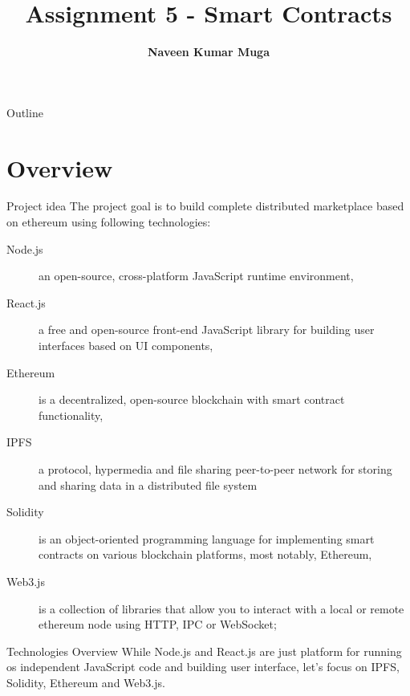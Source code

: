 \documentclass[9pt]{beamer}
\title[Beamer Name]{Assignment 5 - Smart Contracts} %
\author[N. K. Muga]{ \textbf{\Large Naveen Kumar Muga}} %
\institute[UAB]{\large nmuga@uab.edu}
\date{}
\begin{document}
\frame[plain]{\titlepage}


\begin{frame}{Outline}
  \tableofcontents
\end{frame}

\section{Overview}

\begin{frame}{Project idea}
    The project goal is to build complete distributed marketplace based on ethereum using following technologies:
    \begin{description}
        \item[Node.js] an open-source, cross-platform JavaScript runtime environment,
        \item[React.js] a free and open-source front-end JavaScript library for building user interfaces based on UI components,
        \item[Ethereum] is a decentralized, open-source blockchain with smart contract functionality,
        \item[IPFS] a protocol, hypermedia and file sharing peer-to-peer network for storing and sharing data in a distributed file system
        \item[Solidity] is an object-oriented programming language for implementing smart contracts on various blockchain platforms, most notably, Ethereum,
        \item[Web3.js] is a collection of libraries that allow you to interact with a local or remote ethereum node using HTTP, IPC or WebSocket;
    \end{description}
\end{frame}

\begin{frame}{Technologies Overview}
    While Node.js and React.js are just platform for running os independent JavaScript code and building user interface, let's focus on IPFS, Solidity, Ethereum and Web3.js.
\end{frame}
\end{document}
